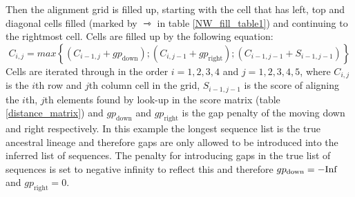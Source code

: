 Then the alignment grid is filled up, starting with the cell that has left, top and diagonal cells filled (marked by $\rightarrowtriangle$ in table \ref{NW_fill_table1}) and continuing to the rightmost cell.
Cells are filled up by the following equation:
$$
C_{i,j} = max\left\{ (C_{i-1,j} + gp_{\text{down}}); (C_{i,j-1} + gp_{\text{right}}); (C_{i-1,j-1} + S_{i-1,j-1})  \right\}
$$
Cells are iterated through in the order $i=1,2,3,4$ and $j=1,2,3,4,5$, where $C_{i,j}$ is the $i$th row and $j$th column cell in the grid, $S_{i-1,j-1}$ is the score of aligning the $i$th, $j$th elements found by look-up in the score matrix (table \ref{distance_matrix}) and $gp_{\text{down}}$ and $gp_{\text{right}}$ is the gap penalty of the moving down and right respectively.
In this example the longest sequence list is the true ancestral lineage and therefore gaps are only allowed to be introduced into the inferred list of sequences.
The penalty for introducing gaps in the true list of sequences is set to negative infinity to reflect this and therefore $gp_{\text{down}} = -\text{Inf}$ and $gp_{\text{right}} = 0$.

